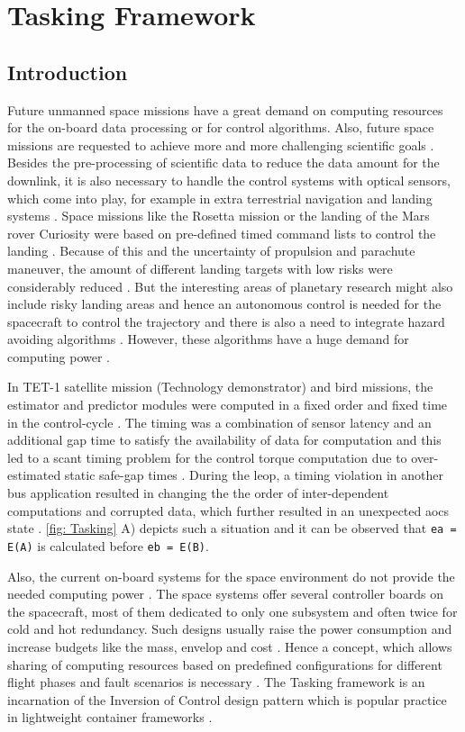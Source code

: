
\chapter{Tasking Framework}
\label{chap: Tasking framework}
\section{Introduction}
Future unmanned space missions have a great demand on computing resources for the on-board data processing or for control algorithms. Also, future space missions are requested to achieve more and more challenging scientific goals \cite{PhdThesis}. Besides the pre-processing of scientific data to reduce the data amount for the downlink, it is also necessary to handle the control systems with optical sensors, which come into play, for example in extra terrestrial navigation and landing systems \cite{ATON}. Space missions like the Rosetta mission or the landing of the Mars rover Curiosity were based on pre-defined timed command lists to control the landing \cite{TaskFr}. Because of this and the uncertainty of propulsion and parachute maneuver, the amount of different landing targets with low risks were considerably reduced \cite{TaskFr}. But the interesting areas of planetary research might also include risky landing areas and hence an autonomous control is needed for the spacecraft to control the trajectory and there is also a need to integrate hazard avoiding algorithms \cite{ATON}. However, these algorithms have a huge demand for computing power \cite{TaskFr}. 

In TET-1 satellite mission (Technology demonstrator) and \ac{bird} missions, the estimator and predictor modules were computed in a fixed order and fixed time in the control-cycle \cite{TETBIRD}. The timing was a combination of sensor latency and an additional gap time to satisfy the availability of data for computation and this led to a scant timing problem for the control torque computation due to over-estimated static safe-gap times \cite{TETBIRD}\cite{TETtoEUCROPIS}. During the \ac{leop}, a timing violation in another bus application resulted in changing the the order of inter-dependent computations and corrupted data, which further resulted in an unexpected \ac{aocs} state \cite{TETBIRD}. \cref{fig: Tasking} A) depicts such a situation and it can be observed that \texttt{ea = E(A)} is calculated before \texttt{eb = E(B)}. 

Also, the current on-board systems for the space environment do not provide the needed computing power \cite{TaskFr}. The space systems offer several controller boards on the spacecraft, most of them dedicated to only one subsystem and often twice for cold and hot redundancy. Such designs usually raise the power consumption and increase budgets like the mass, envelop and cost \cite{TaskFr}. Hence a concept, which allows sharing of computing resources based on predefined configurations for different flight phases and fault scenarios is necessary \cite{TaskFr}. The Tasking framework is an incarnation of the Inversion of Control design pattern which is popular practice in lightweight container frameworks \cite{InvOfCntrlurl}. 

